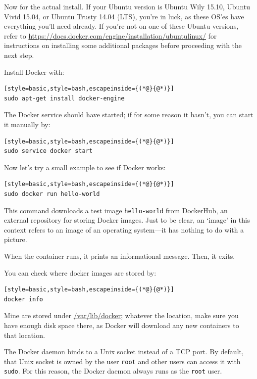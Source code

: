 \documentclass[12pt, a4paper, twoside, openany, titlepage]{book}
\begin{document}
Now for the actual install. If your Ubuntu version is Ubuntu Wily 15.10, Ubuntu Vivid 15.04, or Ubuntu Trusty 14.04 (LTS), you're in luck, as these OS'es have everything you'll need already. If you're not on one of these Ubuntu versions, refer to \url{https://docs.docker.com/engine/installation/ubuntulinux/} for instructions on installing some additional packages before proceeding with the next step.

Install Docker with:
\begin{lstlisting}[style=basic,style=bash,escapeinside={(*@}{@*)}]
sudo apt-get install docker-engine
\end{lstlisting}

The Docker service should have started; if for some reason it hasn't, you can start it manually by:
\begin{lstlisting}[style=basic,style=bash,escapeinside={(*@}{@*)}]
sudo service docker start
\end{lstlisting}

Now let's try a small example to see if Docker works:
\begin{lstlisting}[style=basic,style=bash,escapeinside={(*@}{@*)}]
sudo docker run hello-world
\end{lstlisting}

This command downloads a test image \texttt{hello-world} from DockerHub, an external repository for storing Docker images. Just to be clear, an `image' in this context refers to an image of an operating system---it has nothing to do with a picture.

When the container runs, it prints an informational message. Then, it exits.

You can check where docker images are stored by:
\begin{lstlisting}[style=basic,style=bash,escapeinside={(*@}{@*)}]
docker info
\end{lstlisting}
Mine are stored under \url{/var/lib/docker}; whatever the location, make sure you have enough disk space there, as Docker will download any new containers to that location.

The Docker daemon binds to a Unix socket instead of a TCP port. By default, that Unix socket is owned by the user \texttt{root} and other users can access it with \texttt{sudo}. For this reason, the Docker daemon always runs as the \texttt{root} user.
\end{document}
